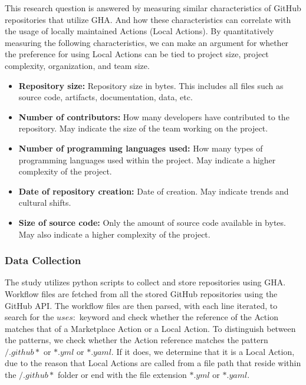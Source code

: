\documentclass[conference]{IEEEtran}
\begin{document}
           This research question is answered by measuring similar characteristics of GitHub repositories that utilize GHA. And how these characteristics can correlate with the usage of locally maintained Actions (Local Actions). By quantitatively measuring the following characteristics, we can make an argument for whether the preference for using Local Actions can be tied to project size, project complexity, organization, and team size. \\
          \begin{itemize}
            \item \textbf{Repository size:} Repository size in bytes. This includes all files such as source code, artifacts, documentation, data, etc.
            \item \textbf{Number of contributors:} How many developers have contributed to the repository. May indicate the size of the team working on the project.
            \item	\textbf{Number of programming languages used:} How many types of programming languages used within the project. May indicate a higher complexity of the project.
            \item \textbf{Date of repository creation:} Date of creation. May indicate trends and cultural shifts.
            \item \textbf{Size of source code:} Only the amount of source code available in bytes. May also indicate a higher complexity of the project. \\
          \end{itemize}
          
          \subsubsection{\textbf{Data Collection}}
            The study utilizes python scripts\cite{Marof2024}  to collect and store repositories using GHA. Workflow files are fetched from all the stored GitHub repositories using the GitHub API.  The workflow files are then parsed, with each line iterated, to search for the $uses:$ keyword and check whether the reference of the Action matches that of a Marketplace Action or a Local Action. To distinguish between the patterns, we check whether the Action reference matches the pattern $/.github*$ or $*.yml$ or $*.yaml$. If it does, we determine that it is a Local Action, due to the reason that Local Actions are called from a file path that reside within the $/.github*$ folder or end with the file extension $*.yml$ or $*.yaml$.
\end{document}
